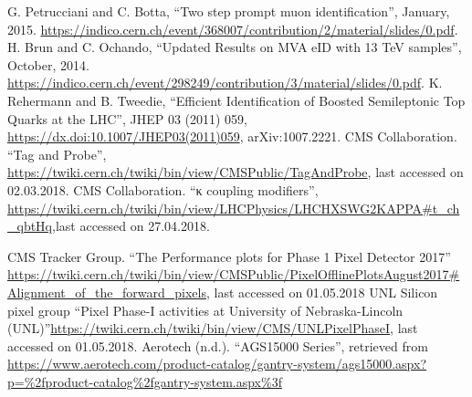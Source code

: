 \documentclass[print]{nuthesis}
\begin{document}
\begin{thebibliography}{300}
 G. Petrucciani and C. Botta, ``Two step prompt muon identification'', January, 2015. \url{https://indico.cern.ch/event/368007/contribution/2/material/slides/0.pdf}.
 H. Brun and C. Ochando, ``Updated Results on MVA eID with 13 TeV samples'', October, 2014. \url{https://indico.cern.ch/event/298249/contribution/3/material/slides/0.pdf}.
 K. Rehermann and B. Tweedie, ``Efficient Identification of Boosted Semileptonic Top Quarks at the LHC'', JHEP 03 (2011) 059, \url{https://dx.doi:10.1007/JHEP03(2011)059}, arXiv:1007.2221.
 CMS Collaboration. ``Tag and Probe'', \url{https://twiki.cern.ch/twiki/bin/view/CMSPublic/TagAndProbe}, last accessed on 02.03.2018. 
 CMS Collaboration. ``κ coupling modifiers'', \url{https://twiki.cern.ch/twiki/bin/view/LHCPhysics/LHCHXSWG2KAPPA#t_ch_qbtHq},last accessed on 27.04.2018.




 CMS Tracker Group. ``The Performance plots for Phase 1 Pixel Detector 2017'' \url{https://twiki.cern.ch/twiki/bin/view/CMSPublic/PixelOfflinePlotsAugust2017#Alignment_of_the_forward_pixels}, last accessed on 01.05.2018
 UNL Silicon pixel group ``Pixel Phase-I activities at University of Nebraska-Lincoln (UNL)''\url{https://twiki.cern.ch/twiki/bin/view/CMS/UNLPixelPhaseI}, last accessed on 01.05.2018.
 Aerotech (n.d.). ``AGS15000 Series'', retrieved from \url{https://www.aerotech.com/product-catalog/gantry-system/ags15000.aspx?p=\%2fproduct-catalog\%2fgantry-system.aspx\%3f}

  
  
\end{thebibliography}
  
%
%
\end{document}
